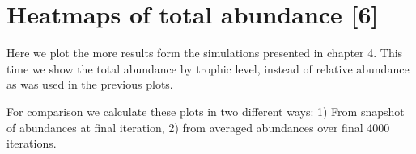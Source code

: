 \section{Heatmaps of total abundance [6]}
\label{sec:tot_tl_abun}

Here we plot the more results form the simulations presented in chapter 4. This time we show the total abundance by trophic level, instead of relative abundance as was used in the previous plots.

For comparison we calculate these plots in two different ways: 1) From snapshot of abundances at final iteration, 2) from averaged abundances over final 4000 iterations. 